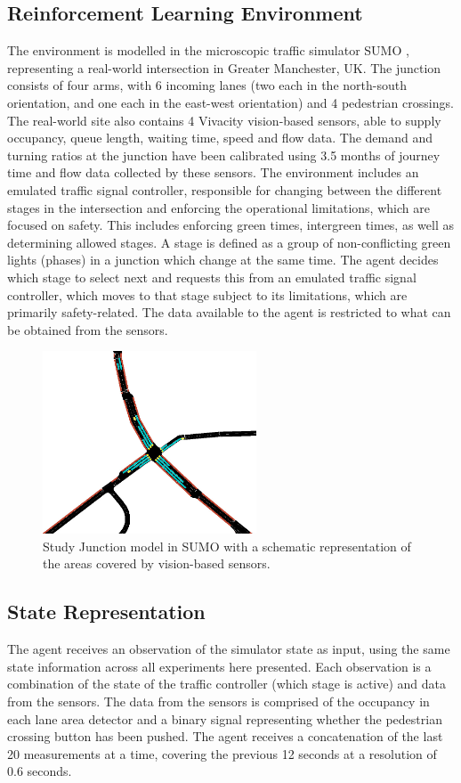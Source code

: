 \documentclass[conference]{IEEEtran}
\begin{document}
\subsection{Reinforcement Learning Environment}
The environment is modelled in the microscopic traffic simulator SUMO \cite{sumo}, representing a real-world intersection in Greater Manchester, UK.
The junction consists of four arms, with 6 incoming lanes (two each in the north-south orientation, and one each in the east-west orientation) and 4 pedestrian crossings.
The real-world site also contains 4 Vivacity vision-based sensors, able to supply occupancy, queue length, waiting time, speed and flow data.
The demand and turning ratios at the junction have been calibrated using 3.5 months of journey time and flow data collected by these sensors.
The environment includes an emulated traffic signal controller, responsible for changing between the different stages in the intersection and enforcing the operational limitations, which are focused on safety.
This includes enforcing green times, intergreen times, as well as determining allowed stages.  
A stage is defined as a group of non-conflicting green lights (phases) in a junction which change at the same time.
The agent decides which stage to select next and requests this from an emulated traffic signal controller, which moves to that stage subject to its limitations, which are primarily safety-related.
The data available to the agent is restricted to what can be obtained from the sensors.     
\begin{figure}                                                
\centering                                                    
\includegraphics[width=2.5in]{intersection}                                    
\caption{Study Junction model in SUMO with a schematic representation of the areas covered by vision-based sensors.}                                  
\label{intersection}                                               
\end{figure}     
\subsection{State Representation}
The agent receives an observation of the simulator state as input, using the same state information across all experiments here presented.
Each observation is a combination of the state of the traffic controller (which stage is active) and data from the sensors.
The data from the sensors is comprised of the occupancy in each lane area detector and a binary signal representing whether the pedestrian crossing button has been pushed.
The agent receives a concatenation of the last 20 measurements at a time, covering the previous 12 seconds at a resolution of 0.6 seconds.
\end{document}
